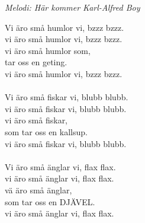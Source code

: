 {\footnotesize\textit{Melodi: Här kommer Karl-Alfred Boy}}\par
\vspace{10pt}
Vi äro små humlor vi, bzzz bzzz.\\
vi äro små humlor vi, bzzz bzzz.\\
vi äro små humlor som,\\
tar oss en geting.\\
vi äro små humlor vi, bzzz bzzz.\\
\\
Vi äro små fiskar vi, blubb blubb.\\
vi äro små fiskar vi, blubb blubb.\\
vi äro små fiskar,\\
som tar oss en kallsup.\\
vi äro små fiskar vi, blubb blubb.\\
\\
Vi äro små änglar vi, flax flax.\\
vi äro små änglar vi, flax flax.\\
vä äro små änglar,\\
som tar oss en DJÄVEL.\\
vi äro små änglar vi, flax flax.
